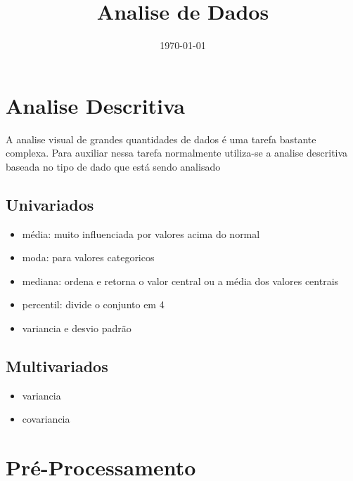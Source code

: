 \documentclass[a4paper, 12pt]{article}
\title{Analise de Dados}
\date{\today}
\begin{document}
\maketitle

\section{Analise Descritiva}

A analise visual de grandes quantidades de dados é uma tarefa bastante complexa. Para auxiliar nessa tarefa normalmente utiliza-se a analise descritiva baseada no tipo de dado que está sendo analisado

\subsection{Univariados}

\begin{itemize}

\item média: muito influenciada por valores acima do normal 

\item moda: para valores categoricos

\item mediana: ordena e retorna o valor central ou a média dos valores centrais  

\item percentil: divide o conjunto em 4 

\item variancia e desvio padrão

\end{itemize}

\subsection{Multivariados}

\begin{itemize}

\item variancia

\item covariancia

\end{itemize}

\section{Pré-Processamento}
\end{document}
